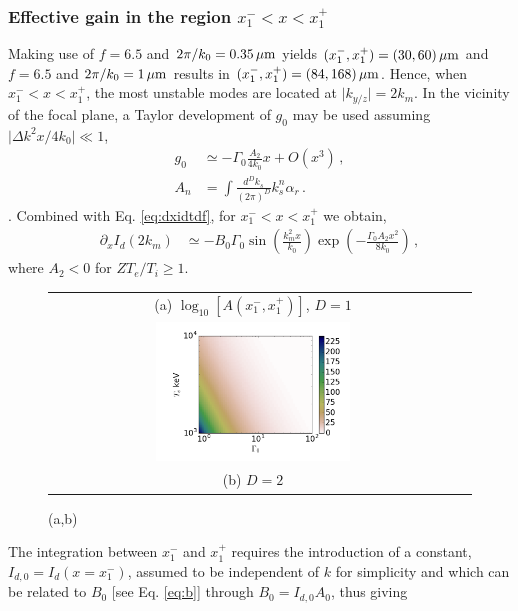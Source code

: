 \documentclass[
 reprint,
 amsmath,amssymb,
 aps,
]{revtex4-1}
\begin{document}
\subsubsection{Effective gain in the region $x_1^-<x<x_1^+$}
Making use of  $f=6.5$ and $2\pi/k_0=0.35\,\rm \mu m$ yields  $(x_1^-,x_1^+)= (30,60)\,\rm\mu m$  and  $f=6.5$ and $2\pi/k_0=1\,\rm \mu m$ results in $(x_1^-,x_1^+)= (84,168)\,\rm\mu m$. 
Hence, when $x_1^-<x<x_1^+$, the most unstable modes are located at $\vert k_{y/z}\vert= 2k_m$. In the vicinity of the focal plane, a Taylor development of  $g_0$ may be used assuming $\vert \Delta k^2x/4k_0\vert  \ll 1$,
\begin{align}
g_0&\simeq -\Gamma_0  \frac{A_2}{4k_0} x + O(x^3)  \label{eq:g0td}\, ,\\ 
A_n&=\int\frac{d^Dk_s}{(2\pi)^{D}}k_s^n\alpha_r \, . \label{eq:an}
\end{align}. 
Combined with Eq. \eqref{eq:dxidtdf}, for $x_1^-   <x < x_1^+$  we obtain,
\begin{align}
\partial_xI_d(2k_m)&\simeq -B_0\Gamma_0
\sin\left({\frac{ k_m^2x}{k_0}}  \right)
\exp\left(  - \frac{ \Gamma_0 A_2x^2}{8k_0}  \right)
\, , \label{eq:dxx0}
\end{align}
where $A_2<0$ for $ZT_e/T_i\ge 1$. 
\begin{figure}[!]
\begin{tabular}{cc}
(a) $\log_{10}[A(x_1^-,x_1^+)]$,  $D=1$\\
\includegraphics[width=0.49\textwidth]{Gx1_D2.png}\\
(b) $D=2$\\
\end{tabular}
\caption{ \label{fig:gx1}
(a,b) 
 }
\end{figure}
The integration between $x_1^-$ and $x_1^+$ requires the introduction of a constant, $I_{d,0}=I_d(x=x_1^-)$, assumed to be independent of $k$ for simplicity and which can be related to $B_0$ [see Eq. \eqref{eq:b}] through $B_0=I_{d,0}A_0$, thus giving
\end{document}
